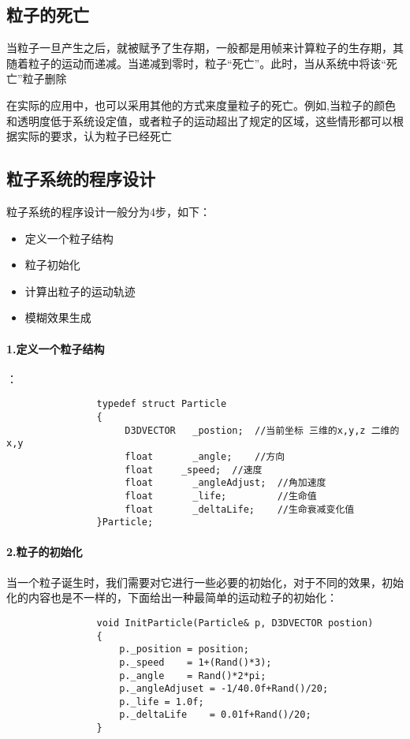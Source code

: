 \documentclass[UTF8,a4paper,14pt]{ctexart}
\begin{document}
	\subsection{粒子的死亡}
		当粒子一旦产生之后，就被赋予了生存期，一般都是用帧来计算粒子的生存期，其随着粒子的运动而递减。当递减到零时，粒子“死亡”。此时，当从系统中将该“死亡”粒子删除
		
		在实际的应用中，也可以采用其他的方式来度量粒子的死亡。例如,当粒子的颜色和透明度低于系统设定值，或者粒子的运动超出了规定的区域，这些情形都可以根据实际的要求，认为粒子已经死亡

	\subsection{粒子系统的程序设计}		
		粒子系统的程序设计一般分为4步，如下：
			\begin{itemize}
				\item 定义一个粒子结构
				\item 粒子初始化
				\item 计算出粒子的运动轨迹
				\item 模糊效果生成
			\end{itemize}
		\paragraph{1.定义一个粒子结构}：
			\begin{lstlisting}
				typedef struct Particle
				{
					 D3DVECTOR   _postion; 	//当前坐标 三维的x,y,z 二维的x,y
					 float		 _angle;	//方向
					 float     _speed;	//速度
					 float		 _angleAdjust;	//角加速度
					 float		 _life;			//生命值
					 float		 _deltaLife;	//生命衰减变化值
				}Particle;
			\end{lstlisting}
		
		\paragraph{2.粒子的初始化}
			当一个粒子诞生时，我们需要对它进行一些必要的初始化，对于不同的效果，初始化的内容也是不一样的，下面给出一种最简单的运动粒子的初始化：
			\begin{lstlisting}
				void InitParticle(Particle& p, D3DVECTOR postion)
				{
					p._position = position;
					p._speed    = 1+(Rand()*3);
					p._angle    = Rand()*2*pi;
					p._angleAdjuset = -1/40.0f+Rand()/20;
					p._life = 1.0f;
					p._deltaLife    = 0.01f+Rand()/20;
				}
			\end{lstlisting}
			
\end{document}
